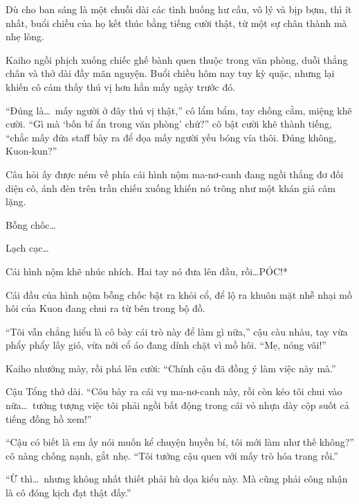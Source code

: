 \documentclass[../main.tex]{subfiles}
\begin{document}
Dù cho ban sáng là một chuỗi dài các tình huống hư cấu, vô lý và bịp bợm, thì ít nhất, buổi chiều của họ kết thúc bằng tiếng cười thật, từ một sự chân thành mà nhẹ lòng.

\omk

Kaiho ngồi phịch xuống chiếc ghế bành quen thuộc trong văn phòng, duỗi thẳng chân và thở dài đầy mãn nguyện. Buổi chiều hôm nay tuy kỳ quặc, nhưng lại khiến cô cảm thấy thú vị hơn hẳn mấy ngày trước đó.

``Đúng là\dots\ mấy người ở đây thú vị thật,'' cô lẩm bẩm, tay chống cằm, miệng khẽ cười. ``Gì mà `bốn bí ẩn trong văn phòng' chứ?'' cô bật cười khẽ thành tiếng, ``chắc mấy đứa staff bày ra để dọa mấy người yếu bóng vía thôi. Đúng không, Kuon-kun?''

Câu hỏi ấy được ném về phía cái hình nộm ma-nơ-canh đang ngồi thẳng đơ đối diện cô, ánh đèn trên trần chiếu xuống khiến nó trông như một khán giả câm lặng.

Bỗng chốc\dots

Lạch cạc\dots

Cái hình nộm khẽ nhúc nhích. Hai tay nó đưa lên đầu, rồi\dots *PÓC!*

\begin{figure}[H]
  \centering
\end{figure}

Cái đầu của hình nộm bỗng chốc bật ra khỏi cổ, để lộ ra khuôn mặt nhễ nhại mồ hôi của Kuon đang chui ra từ bên trong bộ đồ.

``Tôi vẫn chẳng hiểu là cô bày cái trò này để làm gì nữa,'' cậu càu nhàu, tay vừa phẩy phẩy lấy gió, vừa nới cổ áo đang dính chặt vì mồ hôi. ``Mẹ, nóng vãi!''

Kaiho nhướng mày, rồi phá lên cười: ``Chính cậu đã đồng ý làm việc này mà.''

Cậu Tổng thở dài. ``Côu bày ra cái vụ ma-nơ-canh này, rồi còn kéo tôi chui vào nữa\dots\ tưởng tượng việc tôi phải ngồi bất động trong cái vỏ nhựa dày cộp suốt cả tiếng đồng hồ xem!''

``Cậu có biết là em ấy nói muốn kể chuyện huyền bí, tôi mới làm như thế không?'' cô nàng chống nạnh, gắt nhẹ. ``Tôi tưởng cậu quen với mấy trò hóa trang rồi.''

``Ừ thì\dots\ nhưng không nhất thiết phải hù dọa kiểu này. Mà cũng phải công nhận là cô đóng kịch đạt thật đấy.''
\end{document}
